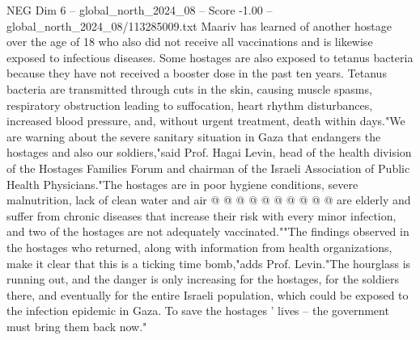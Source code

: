 \begin{textsample}{NEG Dim 6 – global\_north\_2024\_08 – Score -1.00 – global\_north\_2024\_08/113285009.txt}
Maariv has learned of another hostage over the age of 18 who also did not receive all vaccinations and is likewise exposed to infectious diseases.
Some hostages are also exposed to tetanus bacteria because they have not received a booster dose in the past ten years.
Tetanus bacteria are transmitted through cuts in the skin, causing muscle spasms, respiratory obstruction leading to suffocation, heart rhythm disturbances, increased blood pressure, and, without urgent treatment, death within days."We are warning about the severe sanitary situation in Gaza that endangers the hostages and also our soldiers,"said Prof.
Hagai Levin, head of the health division of the Hostages Families Forum and chairman of the Israeli Association of Public Health Physicians."The hostages are in poor hygiene conditions, severe malnutrition, lack of clean water and air @ @ @ @ @ @ @ @ @ @ are elderly and suffer from chronic diseases that increase their risk with every minor infection, and two of the hostages are not adequately vaccinated.""The findings observed in the hostages who returned, along with information from health organizations, make it clear that this is a ticking time bomb,"adds Prof.
Levin."The hourglass is running out, and the danger is only increasing for the hostages, for the soldiers there, and eventually for the entire Israeli population, which could be exposed to the infection epidemic in Gaza.
To save the hostages ' lives -- the government must bring them back now."

\end{textsample}
